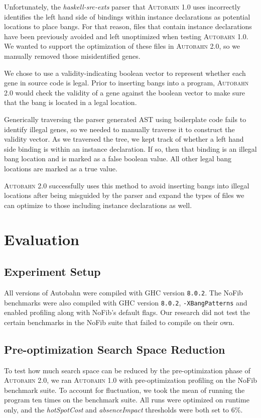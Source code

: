 \documentclass[format=sigplan]{acmart}
\newcommand{\hotspotcost}[0]{\textit{hotSpotCost}}
\newcommand{\Ao}[0]{\textsc{Autobahn 1.0}}
\newcommand{\At}[0]{\textsc{Autobahn 2.0}}
\newcommand{\preopt}[0]{pre-optimization}
\newcommand{\Preopt}[0]{Pre-optimization}
\newcommand{\absim}[0]{\textit{absenceImpact}}
\begin{document}
Unfortunately, the \textit{haskell-src-exts} parser that \Ao{} uses incorrectly identifies the left hand side of bindings within instance declarations as potential locations to place bangs. For that reason, files that contain instance declarations have been previously avoided and left unoptimized when testing \Ao{}. We wanted to support the optimization of these files in \At{}, so we manually removed those misidentified genes.

We chose to use a validity-indicating boolean vector to represent whether each gene in source code is legal. Prior to inserting bangs into a program, \At{} would check the validity of a gene against the boolean vector to make sure that the bang is located in a legal location.

Generically traversing the parser generated AST using boilerplate code fails to identify illegal genes, so we needed to manually traverse it to construct the validity vector. As we traversed the tree, we kept track of whether a left hand side binding is within an instance declaration. If so, then that binding is an illegal bang location and is marked as a false boolean value. All other legal bang locations are marked as a true value.

\At{} successfully uses this method to avoid inserting bangs into illegal locations after being misguided by the parser and expand the types of files we can optimize to those including instance declarations as well. 

\section{Evaluation}

\subsection{Experiment Setup}

All versions of Autobahn were compiled with GHC version \texttt{8.0.2}. The NoFib benchmarks were also compiled with GHC version \texttt{8.0.2}, \texttt{-XBangPatterns} and enabled profiling along with NoFib's default flags. Our research did not test the certain benchmarks in the NoFib suite that failed to compile on their own.

\subsection{\Preopt{} Search Space Reduction}
To test how much search space can be reduced by the \preopt{} phase of \At{}, we ran \Ao{} with \preopt{} profiling on the NoFib benchmark suite. To account for fluctuation, we took the mean of running the program ten times on the benchmark suite. All runs were optimized on runtime only, and the \hotspotcost{} and \absim{} thresholds were both set to 6\%. 
\end{document}
